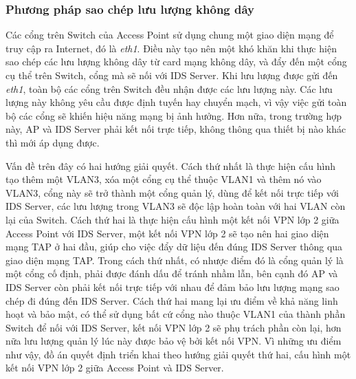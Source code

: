 \subsubsection{Phương pháp sao chép lưu lượng không dây}
Các cổng trên Switch của Access Point sử dụng chung một giao diện mạng để truy cập ra Internet, đó là \emph{eth1}. Điều này tạo nên một khó khăn khi thực hiện sao chép các lưu lượng không dây từ card mạng không dây, và đẩy đến một cổng cụ thể trên Switch, cổng mà sẽ nối với IDS Server. Khi lưu lượng được gửi đến \emph{eth1}, toàn bộ các cổng trên Switch đều nhận được các lưu lượng này. Các lưu lượng này không yêu cầu được định tuyến hay chuyển mạch, vì vậy việc gửi toàn bộ các cổng sẽ khiến hiệu năng mạng bị ảnh hưởng. Hơn nữa, trong trường hợp này, AP và IDS Server phải kết nối trực tiếp, không thông qua thiết bị nào khác thì mới áp dụng được.

Vấn đề trên đây có hai hướng giải quyết. Cách thứ nhất là thực hiện cấu hình tạo thêm một VLAN3, xóa một cổng cụ thể thuộc VLAN1 và thêm nó vào VLAN3, cổng này sẽ trở thành một cổng quản lý, dùng để kết nối trực tiếp với IDS Server, các lưu lượng trong VLAN3 sẽ độc lập hoàn toàn với hai VLAN còn lại của Switch. Cách thứ hai là thực hiện cấu hình một kết nối VPN lớp 2 giữa Access Point với IDS Server, một kết nối VPN lớp 2 sẽ tạo nên hai giao diện mạng TAP ở hai đầu, giúp cho việc đẩy dữ liệu đến đúng IDS Server thông qua giao diện mạng TAP. Trong cách thứ nhất, có nhược điểm đó là cổng quản lý là một cổng cố định, phải được đánh dấu để tránh nhầm lẫn, bên cạnh đó AP và IDS Server còn phải kết nối trực tiếp với nhau để đảm bảo lưu lượng mạng sao chép đi đúng đến IDS Server. Cách thứ hai mang lại ưu điểm về khả năng linh hoạt và bảo mật, có thể sử dụng bất cứ cổng nào thuộc VLAN1 của thành phần Switch để nối với IDS Server, kết nối VPN lớp 2 sẽ phụ trách phần còn lại, hơn nữa lưu lượng quản lý lúc này được bảo vệ bởi kết nối VPN. Vì những ưu điểm như vậy, đồ án quyết định triển khai theo hướng giải quyết thứ hai, cấu hình một kết nối VPN lớp 2 giữa Access Point và IDS Server.

